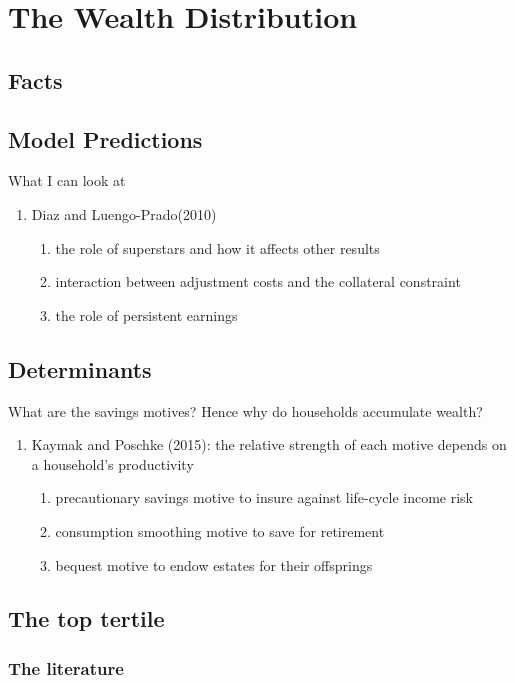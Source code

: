 \documentclass[a4paper,12pt]{article}
\begin{document}
\section{The Wealth Distribution}
\label{Chapter5}

\subsection{Facts}

\subsection{Model Predictions}
What I can look at
\begin{enumerate}
\item Diaz and Luengo-Prado(2010)
\begin{enumerate}
\item the role of superstars and how it affects other results
\item interaction between adjustment costs and the collateral constraint
\item the role of persistent earnings
\end{enumerate}

\end{enumerate}
\subsection{Determinants}
What are the savings motives? Hence why do households accumulate wealth?
\begin{enumerate}
\item Kaymak and Poschke (2015): the relative strength of each motive depends on a household's productivity
\begin{enumerate}
\item precautionary savings motive to insure against life-cycle income risk
\item consumption smoothing motive to save for retirement
\item bequest motive to endow estates for their offsprings
\end{enumerate}
\end{enumerate}


\subsection{The top tertile}
\subsubsection{The literature}
\end{document}
